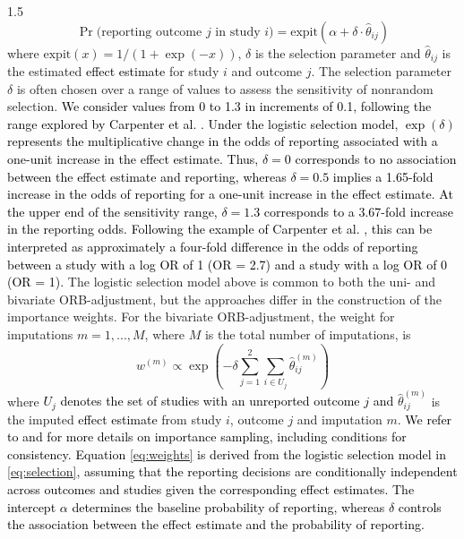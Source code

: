 \documentclass{article}
\newcommand{\mycolor}[1]{\textcolor{black}{#1}}
\begin{document}
\begin{spacing}{1.5}
\begin{equation} \label{eq:selection}
\Pr\mbox{(reporting outcome $j$ in study $i$)} = \text{expit} \left( \alpha + \delta \cdot \hat\theta_{ij} \right)
\end{equation}
where $\text{expit}(x) = 1/(1+\exp(-x))$, $\delta$ is the selection parameter and $\hat\theta_{ij}$ is the estimated \mycolor{effect estimate} for study $i$ and outcome $j$. The selection parameter $\delta$ is often chosen over a range of values to assess the sensitivity of nonrandom selection. \mycolor{We consider values from 0 to 1.3 in increments of 0.1, following the range explored by Carpenter et al. \cite{carpenter2011assessing}. Under the logistic selection model, $\exp(\delta)$ represents the multiplicative change in the odds of reporting associated with a one-unit increase in the effect estimate. Thus, $\delta = 0$ corresponds to no association between the effect estimate and reporting, whereas $\delta = 0.5$ implies a 1.65-fold increase in the odds of reporting for a one-unit increase in the effect estimate. At the upper end of the sensitivity range, $\delta = 1.3$ corresponds to a 3.67-fold increase in the reporting odds. Following the example of Carpenter et al. \cite{carpenter2011assessing}, this can be interpreted as approximately a four-fold difference in the odds of reporting between a study with a log OR of 1 (OR = 2.7) and a study with a log OR of 0 (OR = 1).} The logistic selection model above is common to both the uni- and bivariate ORB-adjustment, but the approaches differ in the construction of the importance weights. For the bivariate ORB-adjustment, the weight for imputations $m = 1, ..., M$, where $M$ is the total number of imputations, is 
\begin{equation} \label{eq:weights}
w^{(m)} \propto \exp \left( -\delta \sum_{j=1}^{2}  \sum_{i \in U_j} \hat\theta^{(m)}_{ij} \right)
\end{equation}
where \mycolor{$U_j$ denotes the set of studies with an unreported outcome $j$ and} $\hat\theta^{(m)}_{ij}$ is the imputed \mycolor{effect estimate} from study $i$, outcome $j$ and imputation $m$. \mycolor{We refer to \cite[Section 3.3]{RobertCasella2004} and \cite[Section 8.3.2]{held2020likelihood} for more details on importance sampling, including conditions for consistency.}
\mycolor{Equation \eqref{eq:weights} is derived from the logistic selection model in \eqref{eq:selection}, assuming that the reporting decisions are conditionally independent across outcomes and studies given the corresponding effect estimates. The intercept $\alpha$ determines the baseline probability of reporting, whereas $\delta$ controls the association between the effect estimate and the probability of reporting. 
}
\end{spacing}
\end{document}
